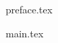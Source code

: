 \documentclass{myclass}
\begin{document}

\frontmatter

\maketitle

\tableofcontents

{preface.tex}


\mainmatter


{main.tex}


\backmatter

\printindex
\end{document}
